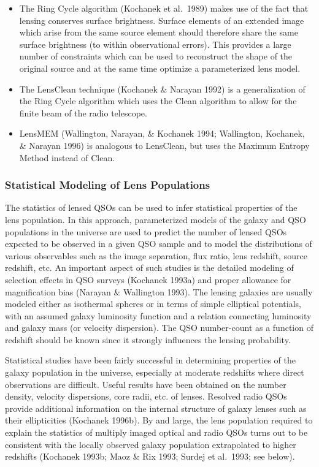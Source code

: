 \documentclass[a4paper,10pt]{article} %
\begin{document}
\begin{itemize}

\item[1] The Ring Cycle algorithm (Kochanek et al.\ 1989) makes use of
the fact that lensing conserves surface brightness. Surface elements
of an extended image which arise from the same source element should
therefore share the same surface brightness (to within observational
errors). This provides a large number of constraints which can be used
to reconstruct the shape of the original source and at the same time
optimize a parameterized lens model.

\item[2] The LensClean technique (Kochanek \& Narayan 1992) is a
generalization of the Ring Cycle algorithm which uses the Clean
algorithm to allow for the finite beam of the radio telescope.

\item[3] LensMEM (Wallington, Narayan, \& Kochanek 1994; Wallington,
Kochanek, \& Narayan 1996) is analogous to LensClean, but uses the
Maximum Entropy Method instead of Clean.

\end{itemize}

\subsubsection{Statistical Modeling of Lens Populations}
\label{NB:subsubsect3.6.2}

The statistics of lensed QSOs can be used to infer statistical
properties of the lens population. In this approach, parameterized
models of the galaxy and QSO populations in the universe are used to
predict the number of lensed QSOs expected to be observed in a given
QSO sample and to model the distributions of various observables such
as the image separation, flux ratio, lens redshift, source redshift,
etc. An important aspect of such studies is the detailed modeling of
selection effects in QSO surveys (Kochanek 1993a) and proper allowance
for magnification bias (Narayan \& Wallington 1993). The lensing
galaxies are usually modeled either as isothermal spheres or in terms
of simple elliptical potentials, with an assumed galaxy luminosity
function and a relation connecting luminosity and galaxy mass (or
velocity dispersion). The QSO number-count as a function of redshift
should be known since it strongly influences the lensing probability.

Statistical studies have been fairly successful in determining
properties of the galaxy population in the universe, especially at
moderate redshifts where direct observations are difficult. Useful
results have been obtained on the number density, velocity
dispersions, core radii, etc. of lenses. Resolved radio QSOs provide
additional information on the internal structure of galaxy lenses such
as their ellipticities (Kochanek 1996b). By and large, the lens
population required to explain the statistics of multiply imaged
optical and radio QSOs turns out to be consistent with the locally
observed galaxy population extrapolated to higher redshifts (Kochanek
1993b; Maoz \& Rix 1993; Surdej et al.\ 1993; see below).
\end{document}
